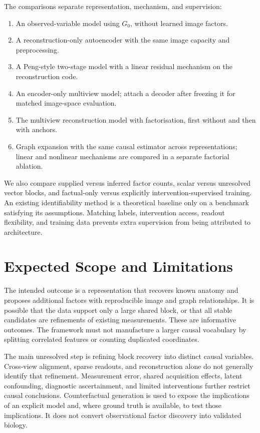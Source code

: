 \documentclass[10pt,twocolumn,letterpaper]{article}
\begin{document}
The comparisons separate representation, mechanism, and supervision:
\begin{enumerate}
 \item An observed-variable model using $G_0$, without learned image factors.
 \item A reconstruction-only autoencoder with the same image capacity and preprocessing.
 \item A Peng-style two-stage model with a linear residual mechanism on the reconstruction code.
 \item An encoder-only multiview model; attach a decoder after freezing it for matched image-space evaluation.
 \item The multiview reconstruction model with factorisation, first without and then with anchors.
 \item Graph expansion with the same causal estimator across representations; linear and nonlinear mechanisms are compared in a separate factorial ablation.
\end{enumerate}
We also compare supplied versus inferred factor counts, scalar versus unresolved vector blocks, and factual-only versus explicitly intervention-supervised training. An existing identifiability method is a theoretical baseline only on a benchmark satisfying its assumptions. Matching labels, intervention access, readout flexibility, and training data prevents extra supervision from being attributed to architecture.

\section{Expected Scope and Limitations}

The intended outcome is a representation that recovers known anatomy and proposes additional factors with reproducible image and graph relationships. It is possible that the data support only a large shared block, or that all stable candidates are refinements of existing measurements. These are informative outcomes. The framework must not manufacture a larger causal vocabulary by splitting correlated features or counting duplicated coordinates.

The main unresolved step is refining block recovery into distinct causal variables. Cross-view alignment, sparse readouts, and reconstruction alone do not generally identify that refinement. Measurement error, shared acquisition effects, latent confounding, diagnostic ascertainment, and limited interventions further restrict causal conclusions. Counterfactual generation is used to expose the implications of an explicit model and, where ground truth is available, to test those implications. It does not convert observational factor discovery into validated biology.
\end{document}
